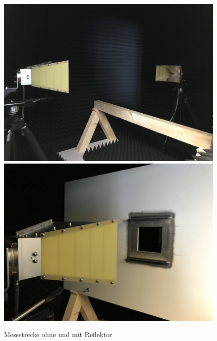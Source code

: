 \begin{figure}[ht]
    \centering
    \includegraphics[height=.2\textheight, draft = true]{Abbildungen/Kapitel4/IMG_5660.jpg}
    \hspace{1cm}
    \includegraphics[height=.2\textheight, draft = true]{Abbildungen/Kapitel4/IMG_5665.jpg}
    \caption{Messstrecke ohne und mit Reflektor}
    \label{fig:4_Messstrecke}
\end{figure}




